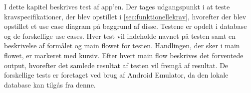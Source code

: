 I dette kapitel beskrives test af app'en. Der tages udgangspunkt i at teste kravspecifikationer, der blev opstillet i \autoref{sec:funktionellekrav}, hvorefter der blev opstillet et use case diagram på baggrund af disse. Testene er opdelt i database og de forskellige use cases. Hver test vil indeholde navnet på testen samt en beskrivelse af formålet og main flowet for testen. Handlingen, der sker i main flowet, er markeret med kursiv. Efter hvert main flow beskrives det forventede output, hvorefter det samlede resultat af testen vil fremgå af resultat. De forskellige tests er foretaget ved brug af Android Emulator, da den lokale database kan tilgås fra denne.


